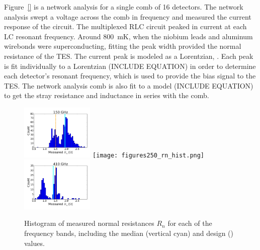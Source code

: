 Figure~\ref{} is a network analysis for a single comb of 16 detectors. 
The network analysis swept a voltage across the comb in frequency and measured the current response of the circuit. 
The multiplexed RLC circuit peaked in current at each LC resonant frequency. 
Around 800~mK, when the niobium leads and aluminum wirebonds were superconducting, fitting the peak width provided the normal resistance of the \ac{TES}. 
The current peak is modeled as a Lorentzian, . 
Each peak is fit individually to a Lorentzian (INCLUDE EQUATION) in order to determine each detector's resonant frequency, which is used to provide the bias signal to the TES. 
The network analysis comb is also fit to a model (INCLUDE EQUATION) to get the stray resistance and inductance in series with the comb. 

\begin{figure}[ht!]
\centering
\includegraphics[width=0.31\textwidth]{figures/150_rn_hist.png}
\texttt{[image: figures250\_rn\_hist.png]}
\includegraphics[width=0.31\textwidth]{figures/410_rn_hist.png}
\caption{Histogram of measured normal resistances $R_{n}$ for each of the frequency bands, including the median (vertical cyan)  
and design () values.
}
\label{fig:rn_histograms}
\end{figure}


